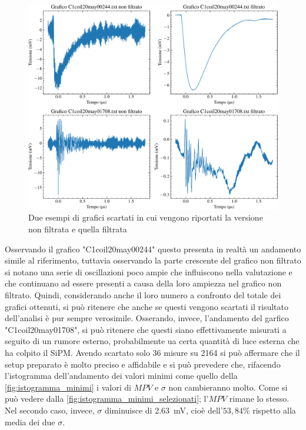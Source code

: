 \begin{figure}[h!]
    \centering
    \includegraphics[width=.85\linewidth]{img/scarti.pdf}
    \caption{Due esempi di grafici scartati in cui vengono riportati la versione non filtrata e quella filtrata}
    \label{fig:scarti}
\end{figure}

Osservando il grafico "C1coil20may00244" questo presenta in realtà un andamento simile al riferimento,
tuttavia osservando la parte crescente del grafico non filtrato si notano una serie di oscillazioni poco ampie
che influiscono nella valutazione e che continuano ad essere presenti a causa della loro ampiezza nel grafico non filtrato. Quindi,
considerando anche il loro numero a confronto del totale dei grafici ottenuti, si può ritenere che anche se questi vengono scartati il risultato
dell'analisi è pur sempre verosimile. Osserando, invece, l'andamento del garfico "C1coil20may01708", si può ritenere che questi siano effettivamente
misurati a seguito di un rumore esterno, probabilmente ua certa quantità di luce esterna che ha colpito il SiPM.
Avendo scartato solo 36 misure su 2164 si può affermare che il setup preparato è molto preciso e affidabile e si può prevedere che, rifacendo
l'istogramma dell'andamento dei valori minimi come quello della \autoref*{fig:istogramma_minimi} i valori di $MPV$ e $\sigma$ non cambieranno molto.
Come si può vedere dalla \autoref*{fig:istogramma_minimi_selezionati}; l'$MPV$ rimane lo stesso. Nel secondo caso, invece, $\sigma$ 
diminuisce di \SI{2,63}{\milli\volt}, cioè dell'$53,84\%$ rispetto alla media dei due $\sigma$.

